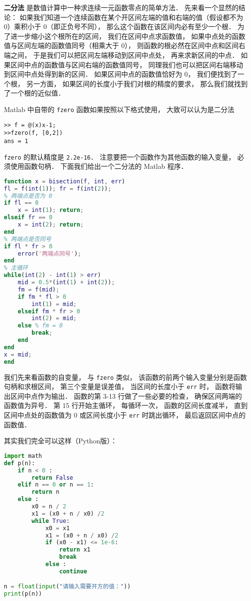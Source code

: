 
\textbf{二分法} 是数值计算中一种求连续一元函数零点的简单方法． 先来看一个显然的结论： 如果我们知道一个连续函数在某个开区间左端的值和右端的值（假设都不为 0）乘积小于 0（即正负号不同）， 那么这个函数在该区间内必有至少一个根． 为了进一步缩小这个根所在的区间， 我们在区间中点求函数值， 如果中点处的函数值与区间左端的函数值同号（相乘大于 0）， 则函数的根必然在区间中点和区间右端之间， 于是我们可以把区间左端移动到区间中点处， 再来求新区间的中点． 如果区间中点的函数值与区间右端的函数值同号， 同理我们也可以把区间右端移动到区间中点处得到新的区间． 如果区间中点的函数值恰好为 0， 我们便找到了一个根， 另一方面， 如果区间的长度小于我们对根的精度的要求， 那么我们就找到了一个根的近似值．

Matlab 中自带的 \verb|fzero| 函数如果按照以下格式使用， 大致可以认为是二分法
\begin{lstlisting}[language=matlabC]
>> f = @(x)x-1;
>>fzero(f, [0,2])
ans = 1
\end{lstlisting}
\verb|fzero| 的默认精度是 \verb|2.2e-16|． 注意要把一个函数作为其他函数的输入变量， 必须使用函数句柄． 下面我们给出一个二分法的 Matlab 程序．

\begin{lstlisting}[language=matlab, caption=bisection.m]
% 二分法求函数的根
function x = bisection(f, int, err)
fl = f(int(1)); fr = f(int(2));
% 两端点是否为 0
if fl == 0
    x = int(1); return;
elseif fr == 0
    x = int(2); return;
end
% 两端点是否同号
if fl * fr > 0
    error('两端点同号');
end
% 主循环
while(int(2) - int(1) > err)
    mid = 0.5*(int(1) + int(2));
    fm = f(mid);
    if fm * fl > 0
        int(1) = mid;
    elseif fm * fr > 0
        int(2) = mid;
    else % fm = 0
        break;
    end
end
x = mid;
end
\end{lstlisting}

我们先来看函数的自变量， 与 \verb|fzero| 类似， 该函数的前两个输入变量分别是函数句柄和求根区间， 第三个变量是误差值， 当区间的长度小于 \verb|err| 时， 函数将输出区间中点作为输出． 函数的第 3-13 行做了一些必要的检查， 确保区间两端的函数值为异号． 第 15 行开始主循环， 每循环一次， 函数的区间长度减半， 直到区间中点处的函数值为 0 或区间长度小于 \verb|err| 时跳出循环， 最后返回区间中点的函数值．


其实我们完全可以这样（Python版）：
\begin{lstlisting}[language=python]
import math
def p(n):
    if n < 0 :
        return False
    elif n == 0 or n == 1:
        return n
    else :
        x0 = n / 2
        x1 = (x0 + n / x0) /2
        while True:
            x0 = x1
            x1 = (x0 + n / x0) /2
            if (x0 - x1) <= 1e-6:
                return x1
                break
            else :
                continue

n = float(input("请输入需要开方的值："))
print(p(n))

\end{lstlisting}